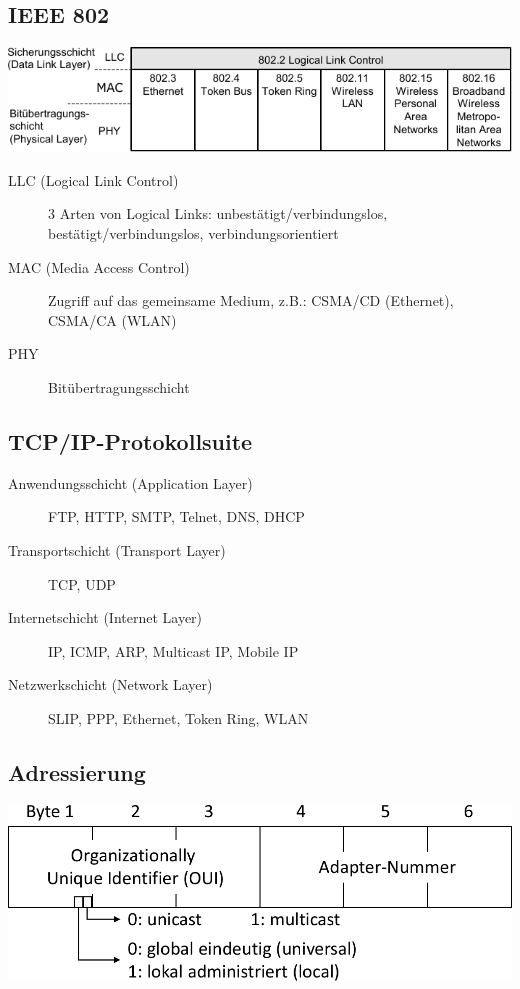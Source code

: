 \documentclass
[
	8pt,		%
	ngerman,	%
	a4paper,	%
	landscape,	%
	final		%
]{extarticle}
\begin{document}
\begin{multicols*}{4}
	\subsection{IEEE 802}
	\begin{center}
		\includegraphics[width=\linewidth]{Documents/IEEE-802.pdf}
	\end{center}
	\begin{description}
		\item[LLC (Logical Link Control)] 3 Arten von Logical Links:
		      unbestätigt/verbindungslos, bestätigt/verbindungslos,
		      verbindungsorientiert
		\item[MAC (Media Access Control)] Zugriff auf das gemeinsame
		      Medium, z.B.:  CSMA/CD (Ethernet),  CSMA/CA (WLAN)
		\item[PHY] Bitübertragungsschicht
	\end{description}
	\subsection{TCP/IP-Protokollsuite}
	\begin{description}
		\item[Anwendungsschicht (Application Layer)]\;\par
		      FTP, HTTP, SMTP, Telnet, DNS, DHCP
		\item[Transportschicht (Transport Layer)]\;\par
		      TCP, UDP
		\item[Internetschicht (Internet Layer)]\;\par
		      IP, ICMP, ARP, Multicast IP, Mobile IP
		\item[Netzwerkschicht (Network Layer)]\;\par
		      SLIP, PPP, Ethernet, Token Ring, WLAN
	\end{description}
	\subsection{Adressierung}
	\begin{center}
		\includegraphics[width=0.7\linewidth]{Documents/MAC.pdf}
	\end{center}

\end{multicols*}
\end{document}
